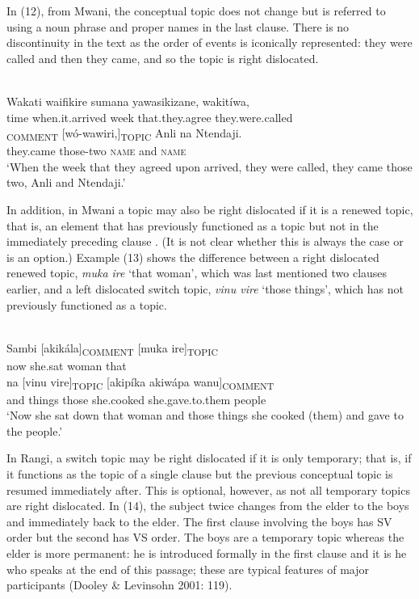 \documentclass[output=paper]{langsci/langscibook}
\begin{document}
In (12), from Mwani, the conceptual topic does not change but is referred to using a noun phrase and proper names in the last clause. There is no discontinuity in the text as the order of events is iconically represented: they were called and then they came, and so the topic is right dislocated.

\ea\label{ex:}
\\
\gll Wakati waifikire sumana yawasikizane, wakitíwa,\\
time when.it.arrived week that.they.agree they.were.called\\


\gll [wakíja]\textsubscript{COMMENT} [wó-wawiri,]\textsubscript{TOPIC} Anli na Ntendaji.\\
they.came those-two \textsc{name }and \textsc{name}\\


\glt \textup{‘}\textup{When the week that they agreed upon arrived, they were called, they came those two, Anli and Ntendaji.’}
\z

In addition, in Mwani a topic may also be right dislocated if it is a renewed topic, that is, an element that has previously functioned as a topic but not in the immediately preceding clause \citep[10-11]{Floor2005}. (It is not clear whether this is always the case or is an option.) Example (13) shows the difference between a right dislocated renewed topic, \textit{muk}\textit{a ire} ‘that woman’, which was last mentioned two clauses earlier, and a left dislocated switch topic, \textit{vinu vire} ‘those things’, which has not previously functioned as a topic.

\ea\label{ex:}
\\
\gll Sambi [akikála]\textsubscript{COMMENT} [muka ire]\textsubscript{TOPIC}\\
now she.sat woman that \\


\gll na [vinu vire]\textsubscript{TOPIC} [akipíka akiwápa wanu]\textsubscript{COMMENT}\\
and things those she.cooked she.gave.to.them people \\


\glt \textup{‘}\textup{Now she sat down that woman and those things she cooked (them) and gave to the people.’}
\z

In Rangi, a switch topic may be right dislocated if it is only temporary; that is, if it functions as the topic of a single clause but the previous conceptual topic is resumed immediately after. This is optional, however, as not all temporary topics are right dislocated. In (14), the subject twice changes from the elder to the boys and immediately back to the elder. The first clause involving the boys has SV order but the second has VS order. The boys are a temporary topic whereas the elder is more permanent: he is introduced formally in the first clause and it is he who speaks at the end of this passage; these are typical features of major participants (Dooley \& Levinsohn 2001: 119).
\end{document}

